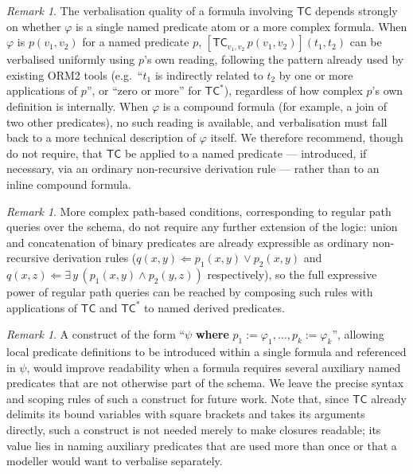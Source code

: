 \documentclass[11pt]{amsart}
\theoremstyle{definition}
\theoremstyle{remark}
\newtheorem{remark}[theorem]{Remark}
\newcommand{\TC}{\mathsf{TC}}
\begin{document}
\begin{remark}
The verbalisation quality of a formula involving $\TC$ depends strongly on
whether $\varphi$ is a single named predicate atom or a more complex
formula. When $\varphi$ is $p(v_1, v_2)$ for a named predicate $p$,
$[\TC_{v_1, v_2}\, p(v_1,v_2)](t_1, t_2)$ can be verbalised uniformly using
$p$'s own reading, following the pattern already used by existing ORM2
tools (e.g.\ ``$t_1$ is indirectly related to $t_2$ by one or more
applications of $p$'', or ``zero or more'' for $\TC^{*}$), regardless of
how complex $p$'s own definition is internally. When $\varphi$ is a
compound formula (for example, a join of two other predicates), no such
reading is available, and verbalisation must fall back to a more technical
description of $\varphi$ itself. We therefore recommend, though do not
require, that $\TC$ be applied to a named predicate — introduced, if
necessary, via an ordinary non-recursive derivation rule — rather than to
an inline compound formula.
\end{remark}

\begin{remark}
More complex path-based conditions, corresponding to regular path queries
over the schema, do not require any further extension of the logic: union
and concatenation of binary predicates are already expressible as ordinary
non-recursive derivation rules ($q(x,y) \Leftarrow p_1(x,y) \vee p_2(x,y)$
and $q(x,z) \Leftarrow \exists\, y\, (p_1(x,y) \wedge p_2(y,z))$
respectively), so the full expressive power of regular path queries can be
reached by composing such rules with applications of $\TC$ and $\TC^{*}$ to
named derived predicates.
\end{remark}

\begin{remark}
A construct of the form ``$\psi$ \textbf{where} $p_1 := \varphi_1, \ldots,
p_k := \varphi_k$'', allowing local predicate definitions to be introduced
within a single formula and referenced in $\psi$, would improve readability
when a formula requires several auxiliary named predicates that are not
otherwise part of the schema. We leave the precise syntax and scoping rules
of such a construct for future work. Note that, since $\TC$ already
delimits its bound variables with square brackets and takes its arguments
directly, such a construct is not needed merely to make closures readable;
its value lies in naming auxiliary predicates that are used more than once
or that a modeller would want to verbalise separately.
\end{remark}
\end{document}

